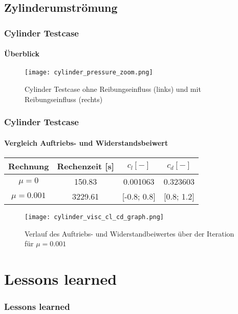 \documentclass[
	11pt, %
	aspectratio=169, %
]{beamer}
\begin{document}
\subsection{Zylinderumströmung}
\begin{frame}
\frametitle{Cylinder Testcase}
\framesubtitle{Überblick}
\begin{figure}
	\texttt{[image: cylinder\_pressure\_zoom.png]}
	\caption{Cylinder Testcase ohne Reibungseinfluss (links) und mit Reibungseinfluss (rechts)}
\end{figure}




\end{frame}
\begin{frame}
	\frametitle{Cylinder Testcase}
	\framesubtitle{Vergleich Auftriebs- und Widerstandsbeiwert}
	\begin{center}
	\begin{tabular}{|c|c|c|c|}
		\hline
		Rechnung & Rechenzeit [s]& $c_l [-]$  & $c_d [-]$\\
		\hline
		$\mu = 0$ & 150.83 & 0.001063 & 0.323603\\
		\hline
		$\mu = 0.001$& 3229.61 & [-0.8; 0.8] & [0.8; 1.2]\\
		\hline
		\end{tabular}
	\end{center}
	\begin{figure}
		\texttt{[image: cylinder\_visc\_cl\_cd\_graph.png]}
		\caption{Verlauf des Auftriebs- und Widerstandbeiwertes über der Iteration für $\mu=0.001$}
	\end{figure}
\end{frame}



 \section{Lessons learned}

 \begin{frame}
 	\frametitle{Lessons learned}

 \end{frame}
\end{document}
